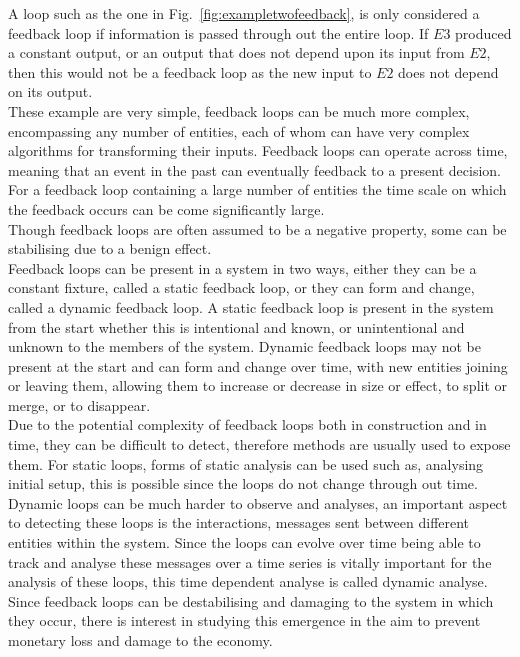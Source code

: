 \documentclass{article}
\begin{document}
A loop such as the one in Fig.~\ref{fig:exampletwofeedback}, is only considered a feedback loop if information is passed through out the entire loop. If $E3$ produced a constant output, or an output that does not depend upon its input from $E2$, then this would not be a feedback loop as the new input to $E2$ does not depend on its output.\\
These example are very simple, feedback loops can be much more complex, encompassing any number of entities, each of whom can have very complex algorithms for transforming their inputs. Feedback loops can operate across time, meaning that an event in the past can eventually feedback to a present decision. For a feedback loop containing a large number of entities the time scale on which the feedback occurs can be come significantly large.\\
Though feedback loops are often assumed to be a negative property, some can be stabilising due to a benign effect.\\
Feedback loops can be present in a system in two ways, either they can be a constant fixture, called a static feedback loop, or they can form and change, called a dynamic feedback loop. A static feedback loop is present in the system from the start whether this is intentional and known, or unintentional and unknown to the members of the system. Dynamic feedback loops may not be present at the start and can form and change over time, with new entities joining or leaving them, allowing them to increase or decrease in size or effect, to split or merge, or to disappear.\\
Due to the potential complexity of feedback loops both in construction and in time, they can be difficult to detect, therefore methods are usually used to expose them. For static loops, forms of static analysis can be used such as, analysing initial setup, this is possible since the loops do not change through out time. Dynamic loops can be much harder to observe and analyses, an important aspect to detecting these loops is the interactions, messages sent between different entities within the system. Since the loops can evolve over time being able to track and analyse these messages over a time series is vitally important for the analysis of these loops, this time dependent analyse is called dynamic analyse.\\
Since feedback loops can be destabilising and damaging to the system in which they occur, there is interest in studying this emergence in the aim to prevent monetary loss and damage to the economy.\\
\end{document}

